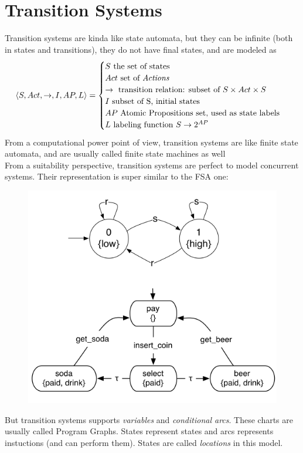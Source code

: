 \documentclass{article}
\begin{document}
		\section{Transition Systems}
			Transition systems are kinda like state automata, but they can be infinite (both in states and transitions), they do not have final states, and are modeled as
			\begin{equation}
				\langle S, Act, \rightarrow, I, AP, L \rangle = 
				\begin{cases}
					S \text{ the set of states}\\
					Act \text{ set of \emph{Actions}}\\
					\rightarrow \text{ transition relation: subset of } S \times Act \times S\\
					I \text{ subset of S, initial states}\\
					AP \text{ Atomic Propositions set, used as state labels}\\
					L \text{ labeling function } S \rightarrow 2^{AP}\\
				\end{cases}
			\end{equation}
			From a computational power point of view, transition systems are like finite state automata, and are usually called finite state machines as well\\
			From a suitability perspective, transition systems are perfect to model concurrent systems. Their representation is super similar to the FSA one:
			\begin{figure}[H]
				\centering
				\includegraphics[width = \textwidth]{./images/TrSys.png}
			\end{figure}
			But transition systems supports \emph{variables} and \emph{conditional arcs}. These charts are usually called Program Graphs. States represent states and arcs represents instuctions (and can perform them). States are called \emph{locations} in this model. 
			
\end{document}
